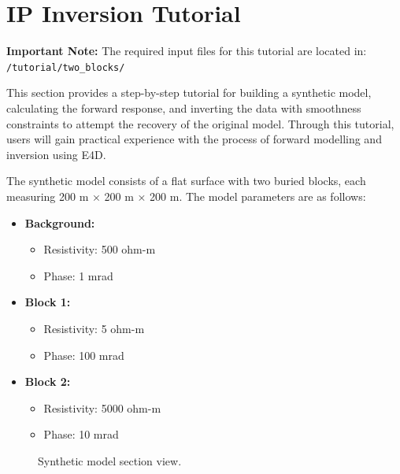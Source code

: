 \documentclass[a4paper,12pt]{article}
\begin{document}
\section{IP Inversion Tutorial}

\begin{framed}
\noindent \textbf{Important Note:} The required input files for this tutorial are located in: \texttt{/tutorial/two\_blocks/}
\end{framed}

This section provides a step-by-step tutorial for building a synthetic model, calculating the forward response, and inverting the data with smoothness constraints to attempt the recovery of the original model. Through this tutorial, users will gain practical experience with the process of forward modelling and inversion using E4D.

The synthetic model consists of a flat surface with two buried blocks, each measuring 200 m × 200 m × 200 m. The model parameters are as follows:

\begin{itemize}
    \item \textbf{Background:} 
    \begin{itemize}
        \item Resistivity: 500 ohm-m
        \item Phase: 1 mrad
    \end{itemize}
    \item \textbf{Block 1:} 
    \begin{itemize}
        \item Resistivity: 5 ohm-m
        \item Phase: 100 mrad
    \end{itemize}
    \item \textbf{Block 2:} 
    \begin{itemize}
        \item Resistivity: 5000 ohm-m
        \item Phase: 10 mrad
    \end{itemize}
\end{itemize}

\begin{figure}[H]
\centering
{}
\caption{Synthetic model section view.}
\label{fig:model}
\end{figure}
\end{document}
